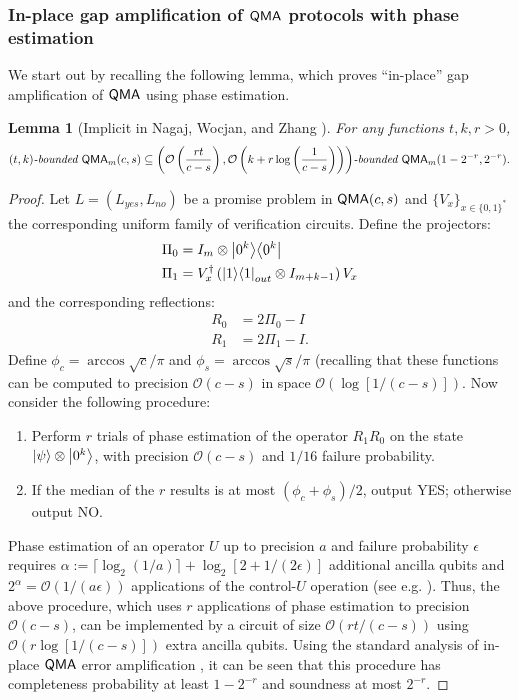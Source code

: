 \documentclass[11pt]{article}
\newtheorem{lemma}{Lemma}
\theoremstyle{definition}
\theoremstyle{remark}
\theoremstyle{definition}
\newcommand\QMA{{\sf{QMA}}}
\newcommand\bddQMA[5]{{\left(#1,#2\right)}\textit{-bounded }\QMA_{#3}(#4,#5)}
\newcommand\bigoh{\mathcal{O}}
\begin{document}
\subsubsection {In-place gap amplification of $\QMA$ protocols with phase estimation}
We start out by recalling the following lemma, which proves ``in-place'' gap amplification of $\QMA$ using phase estimation.
\begin{lemma}[Implicit in Nagaj, Wocjan, and Zhang \cite{nwz11}] \label{lem: gap amp 1}
For any functions $t,k,r>0$, 
\[
\bddQMA{t}{k}{m}{c}{s}\subseteq\bddQMA{\mathcal{O}\left(\frac{rt}{c-s}\right)}{\mathcal{O}\left(k+r\log\left(\frac{1}{c-s}\right)\right)}{m}{1-2^{-r}}{2^{-r}}.
\]
\end{lemma}
\begin{proof}
	Let $L=(L_{yes}, L_{no})$ be a promise problem in $\QMA(c,s)$ and $\{V_x\}_{x\in\{0,1\}^*}$ the corresponding uniform family of verification circuits.
Define the projectors:
\begin{align}
\Pi_0 &= I_m \otimes {\left\vert{0^k}\right\rangle}{\left\langle{0^k}\right\vert} \\
\Pi_1 &= V^\dagger_x \left({\left\vert{1}\right\rangle}{\left\langle{1}\right\vert}_{out} \otimes I_{m+k-1}\right) V_x
\end{align}
and the corresponding reflections:
\begin{align}
R_0 &= 2\Pi_0 - I \\
R_1 &= 2\Pi_1 - I.
\end{align}
Define $\phi_c = \arccos\sqrt{c}/\pi$ and $\phi_s = \arccos\sqrt{s}/\pi$ (recalling that these functions can be computed to precision $\bigoh (c-s)$ in space $\bigoh (\log[1/(c-s)])$. 
Now consider the following procedure:
\begin{enumerate}
\item Perform $r$ trials of phase estimation of the operator $R_1R_0$ on the state ${\left\vert{\psi}\right\rangle}\otimes {\left\vert{0^k}\right\rangle}$, with  precision $\mathcal{O}(c-s)$ and $1/16$ failure probability. 
\item If the median of the $r$ results is at most $(\phi_{c}+\phi_{s})/2$, output YES; otherwise output NO.
\end{enumerate}
Phase estimation of an operator $U$ up to precision $a$ and failure probability $\epsilon$ requires $\alpha := \lceil\log_2(1/a)\rceil + \log_2[2+1/(2\epsilon)]$ additional ancilla qubits and $2^\alpha = \mathcal{O}(1/(a\epsilon))$ applications of the control-$U$ operation (see e.g. \cite{nc00}).  Thus, the above procedure, which uses $r$ applications of phase estimation to precision $\mathcal{O}(c-s)$, can be implemented by a circuit of size $\mathcal{O}(rt/(c-s))$ using $\mathcal{O}(r\log[1/(c-s)])$ extra ancilla qubits. Using the standard analysis of in-place $\QMA$ error amplification \cite{mw05,nwz11}, it can be seen that this procedure has completeness probability at least $1-2^{-r}$ and soundness at most $2^{-r}$.
\end{proof}
\end{document}
